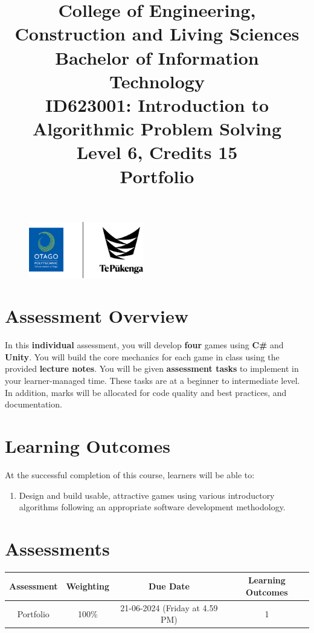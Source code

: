 \documentclass{article}
\author{}
\begin{document}
\begin{figure}
	\centering
	\includegraphics[width=50mm]{../../resources/img/logo.png}
\end{figure}

\title{College of Engineering, Construction and Living Sciences\\Bachelor of Information Technology\\ID623001: Introduction to Algorithmic Problem Solving\\Level 6, Credits 15\\\textbf{Portfolio}}
\date{}
\maketitle

\section*{Assessment Overview}
In this \textbf{individual} assessment, you will develop \textbf{four} games using \textbf{C\#} and \textbf{Unity}. You will build the core mechanics for each game in class using the provided \textbf{lecture notes}. You will be given \textbf{assessment tasks} to implement in your learner-managed time. These tasks are at a beginner to intermediate level. In addition, marks will be allocated for code quality and best practices, and documentation.

\section*{Learning Outcomes}
At the successful completion of this course, learners will be able to:
\begin{enumerate}
	\item Design and build usable, attractive games using various introductory algorithms following an appropriate software development methodology.
\end{enumerate}

\section*{Assessments}
\renewcommand{\arraystretch}{1.5}
\begin{tabular}{|c|c|c|c|}
	\hline
	\textbf{Assessment}                                 & \textbf{Weighting} & \textbf{Due Date}            & \textbf{Learning Outcomes} \\ \hline
	\small Portfolio                        & \small 100\%        & \small 21-06-2024 (Friday at 4.59 PM)  & \small 1                   \\ \hline
\end{tabular}
\end{document}
